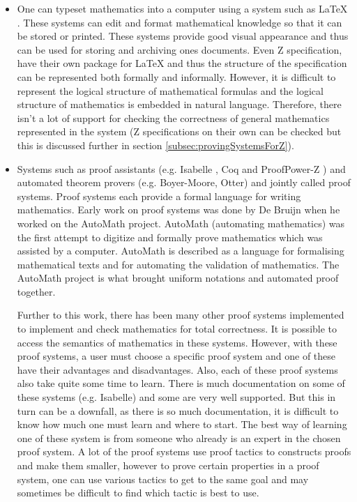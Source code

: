 \begin{itemize}
\item One can typeset mathematics into a computer using a system such as
\LaTeX{} \cite{latex} . These systems can edit and format mathematical knowledge
so that it can be stored or printed. These systems provide good visual
appearance and thus can be used for storing and archiving ones documents. Even Z
specification, have their own package for \LaTeX{} and thus the structure of the
specification can be represented both formally and informally. However, it is
difficult to represent the logical structure of mathematical formulas and the
logical structure of mathematics is embedded in natural language. Therefore,
there isn't a lot of support for checking the correctness of general mathematics
represented in the system (Z specifications on their own can be checked but this
is discussed further in section \ref{subsec:provingSystemsForZ}).

\item Systems such as proof assistants (e.g. Isabelle \cite{isabelle}, Coq
\cite{coq} and ProofPower-Z \cite{pp}) and automated theorem provers (e.g.
Boyer-Moore, Otter) and jointly called proof systems. Proof systems each provide
a formal language for writing mathematics. Early work on proof systems was done
by De Bruijn when he worked on the AutoMath \cite{selectedautomath} project.
AutoMath (automating mathematics) was the first attempt to digitize and formally
prove mathematics which was assisted by a computer. AutoMath is described as a
language for formalising mathematical texts and for automating the validation of
mathematics. The AutoMath project is what brought uniform notations and
automated proof together.

Further to this work, there has been many other proof systems implemented to
implement and check mathematics for total correctness. It is possible to access
the semantics of mathematics in these systems. However, with these proof
systems, a user must choose a specific proof system and one of these have their
advantages and disadvantages. Also, each of these proof systems also take quite
some time to learn. There is much documentation on some of these systems (e.g.
Isabelle) and some are very well supported. But this in turn can be a downfall,
as there is so much documentation, it is difficult to know how much one must
learn and where to start. The best way of learning one of these system is from
someone who already is an expert in the chosen proof system. A lot of the proof
systems use proof tactics to constructs proofs and make them smaller, however to
prove certain properties in a proof system, one can use various tactics to get
to the same goal and may sometimes be difficult to find which tactic is best to
use.


\end{itemize}
